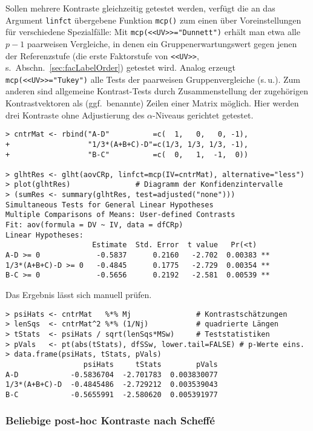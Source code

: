 Sollen mehrere Kontraste gleichzeitig getestet werden, verfügt die an das Argument \lstinline!linfct! übergebene Funktion \lstinline!mcp()! zum einen über Voreinstellungen für verschiedene Spezialfälle: Mit \lstinline!mcp(<<UV>>="Dunnett")! erhält man etwa alle $p-1$ paarweisen Vergleiche, in denen ein Gruppenerwartungswert gegen jenen der Referenzstufe (die erste Faktorstufe von \lstinline!<<UV>>!, s.\ Abschn.\ \ref{sec:facLabelOrder}) getestet wird. Analog erzeugt \lstinline!mcp(<<UV>>="Tukey")! alle Tests der paarweisen Gruppenvergleiche (s.\,u.). Zum anderen sind allgemeine Kontrast-Tests durch Zusammenstellung der zugehörigen Kontrastvektoren als (ggf.\ benannte) Zeilen einer Matrix möglich. Hier werden drei Kontraste ohne Adjustierung des $\alpha$-Niveaus gerichtet getestet.
\begin{lstlisting}
> cntrMat <- rbind("A-D"          =c(  1,   0,   0, -1),
+                  "1/3*(A+B+C)-D"=c(1/3, 1/3, 1/3, -1),
+                  "B-C"          =c(  0,   1,  -1,  0))

> glhtRes <- glht(aovCRp, linfct=mcp(IV=cntrMat), alternative="less")
> plot(glhtRes)               # Diagramm der Konfidenzintervalle
> (sumRes <- summary(glhtRes, test=adjusted("none")))
Simultaneous Tests for General Linear Hypotheses
Multiple Comparisons of Means: User-defined Contrasts
Fit: aov(formula = DV ~ IV, data = dfCRp)
Linear Hypotheses:
                    Estimate  Std. Error  t value   Pr(<t)
A-D >= 0             -0.5837      0.2160   -2.702  0.00383 **
1/3*(A+B+C)-D >= 0   -0.4845      0.1775   -2.729  0.00354 **
B-C >= 0             -0.5656      0.2192   -2.581  0.00539 **
\end{lstlisting}

Das Ergebnis lässt sich manuell prüfen.
\begin{lstlisting}
> psiHats <- cntrMat   %*% Mj               # Kontrastschätzungen
> lenSqs  <- cntrMat^2 %*% (1/Nj)           # quadrierte Längen
> tStats  <- psiHats / sqrt(lenSqs*MSw)     # Teststatistiken
> pVals   <- pt(abs(tStats), dfSSw, lower.tail=FALSE) # p-Werte eins.
> data.frame(psiHats, tStats, pVals)
                  psiHats     tStats        pVals
A-D            -0.5836704  -2.701783  0.003830077
1/3*(A+B+C)-D  -0.4845486  -2.729212  0.003539043
B-C            -0.5655991  -2.580620  0.005391977
\end{lstlisting}

\subsubsection{Beliebige post-hoc Kontraste nach Scheffé}

